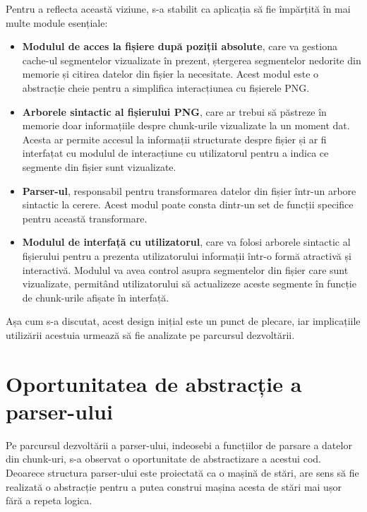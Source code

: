 \documentclass[a4paper,12pt]{report}
\begin{document}
Pentru a reflecta această viziune, s-a stabilit ca aplicația
să fie împărțită în mai multe module esențiale:
\begin{itemize}
  \item 
  \textbf{Modulul de acces la fișiere după poziții absolute},
  care va gestiona cache-ul segmentelor vizualizate în prezent,
  ștergerea segmentelor nedorite din memorie și citirea datelor din fișier la necesitate.
  Acest modul este o abstracție cheie pentru a simplifica interacțiunea cu fișierele \ac{PNG}.

  \item
  \textbf{Arborele sintactic al fișierului \ac{PNG}},
  care ar trebui să păstreze în memorie doar informațiile despre
  chunk-urile vizualizate la un moment dat.
  Acesta ar permite accesul la informații structurate despre fișier
  și ar fi interfațat cu modulul de interacțiune cu utilizatorul
  pentru a indica ce segmente din fișier sunt vizualizate.

  \item
  \textbf{Parser-ul}, responsabil pentru transformarea datelor
  din fișier într-un arbore sintactic la cerere.
  Acest modul poate consta dintr-un set de funcții specifice pentru această transformare.

  \item
  \textbf{Modulul de interfață cu utilizatorul},
  care va folosi arborele sintactic al fișierului pentru
  a prezenta utilizatorului informații într-o formă atractivă și interactivă.
  Modulul va avea control asupra segmentelor din fișier care sunt vizualizate,
  permitând utilizatorului să actualizeze aceste segmente
  în funcție de chunk-urile afișate în interfață.
\end{itemize}

Așa cum s-a discutat, acest design inițial este un punct de plecare,
iar implicațiile utilizării acestuia urmează să fie analizate pe parcursul dezvoltării.


\section{Oportunitatea de abstracție a parser-ului}

Pe parcursul dezvoltării a parser-ului, indeosebi a funcțiilor de parsare a datelor din chunk-uri,
s-a observat o oportunitate de abstractizare a acestui cod.
Deoarece structura parser-ului este proiectată ca o mașină de stări,
are sens să fie realizată o abstracție pentru a putea construi mașina acesta de stări mai ușor
fără a repeta logica.
\end{document}
